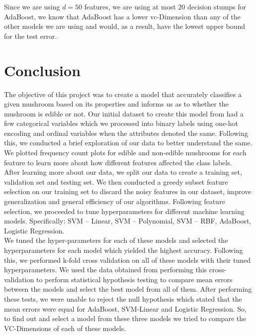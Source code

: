 \documentclass[fleqn]{article}
\begin{document}
    Since we are using $d=50$ features, we are using at most $20$ decision stumps for AdaBoost,
    we know that AdaBoost has a lower vc-Dimension than any of the other models we are using
    and would, as a result, have the lowest upper bound for the test error.

    \section{Conclusion}
    The objective of this project was to create a model that accurately classifies a given mushroom based on its properties and informs us as to whether the mushroom is edible or not. Our initial dataset to create this model from had a few categorical variables which we processed into binary labels using one-hot encoding and ordinal variables when the attributes denoted the same. Following this, we conducted a brief exploration of our data to better understand the same. We plotted frequency count plots for edible and non-edible mushrooms for each feature to learn more about how different features affected the class labels.\\

    After learning more about our data, we split our data to create a training set, validation set and testing set. We then conducted a greedy subset feature selection on our training set to discard the noisy features in our dataset, improve generalization and general efficiency of our algorithms. Following feature selection, we proceeded to tune hyperparameters for different machine learning models. Specifically: SVM – Linear, SVM – Polynomial, SVM – RBF, AdaBoost, Logistic Regression.\\

    We tuned the hyper-parameters for each of these models and selected the hyperparameters for each model which yielded the highest accuracy. Following this, we performed k-fold cross validation on all of these models with their tuned hyperparameters. We used the data obtained from performing this cross-validation to perform statistical hypothesis testing to compare mean errors between the models and select the best model from all of them. After performing these tests, we were unable to reject the null hypothesis which stated that the mean errors were equal for AdaBoost, SVM-Linear and Logistic Regression. So, to find out and select a model from these three models we tried to compare the VC-Dimensions of each of these models.\\
\end{document}
